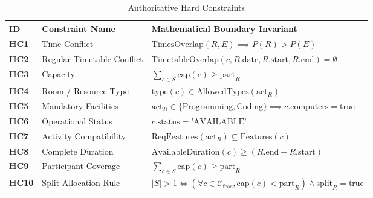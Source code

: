 \documentclass[conference]{IEEEtran}
\begin{document}
\begin{table}[t]
\caption{Authoritative Hard Constraints}
\label{tab:hard_constraints}
\centering
\small
\begin{tabular}{p{1.2cm} p{4.0cm} p{11.5cm}}
\toprule
\textbf{ID} & \textbf{Constraint Name} & \textbf{Mathematical Boundary Invariant} \\
\midrule
\textbf{HC1} & Time Conflict & $\text{TimesOverlap}(R, E) \implies P(R) > P(E)$ \\
\textbf{HC2} & Regular Timetable Conflict & $\text{TimetableOverlap}(c, R.\text{date}, R.\text{start}, R.\text{end}) = \emptyset$ \\
\textbf{HC3} & Capacity & $\sum_{c \in S} \text{cap}(c) \ge \text{part}_R$ \\
\textbf{HC4} & Room / Resource Type & $\text{type}(c) \in \text{AllowedTypes}(\text{act}_R)$ \\
\textbf{HC5} & Mandatory Facilities & $\text{act}_R \in \{\text{Programming}, \text{Coding}\} \implies c.\text{computers} = \text{true}$ \\
\textbf{HC6} & Operational Status & $c.\text{status} = \text{'AVAILABLE'}$ \\
\textbf{HC7} & Activity Compatibility & $\text{ReqFeatures}(\text{act}_R) \subseteq \text{Features}(c)$ \\
\textbf{HC8} & Complete Duration & $\text{AvailableDuration}(c) \ge (R.\text{end} - R.\text{start})$ \\
\textbf{HC9} & Participant Coverage & $\sum_{c \in S} \text{cap}(c) \ge \text{part}_R$ \\
\textbf{HC10} & Split Allocation Rule & $|S| > 1 \iff (\forall c \in \mathcal{C}_{\text{feas}}, \text{cap}(c) < \text{part}_R) \land \text{split}_R = \text{true}$ \\
\bottomrule
\end{tabular}
\end{table}
\end{document}
